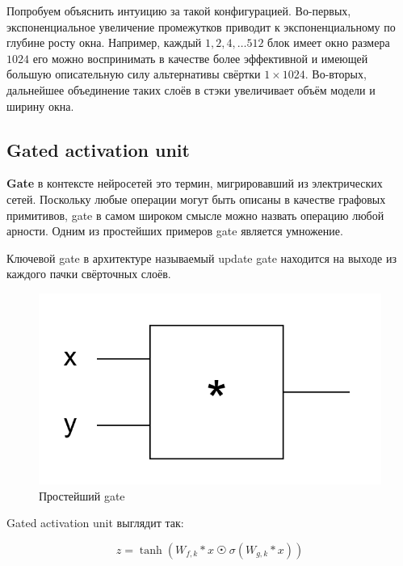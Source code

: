 \documentclass[../diploma.tex]{subfiles}
\begin{document}
Попробуем объяснить интуицию за такой конфигурацией. Во-первых, экспоненциальное увеличение промежутков приводит к экспоненциальному по глубине росту окна. \cite{arxiv:yu-fisher} Например, каждый $1,2,4, \dots 512$ блок имеет окно размера $1024$ его можно воспринимать в качестве более эффективной и имеющей большую описательную силу альтернативы свёртки $1 \times 1024$. Во-вторых, дальнейшее объединение таких слоёв в стэки увеличивает объём модели и ширину окна.

\newpage
\subsection{Gated activation unit}

\begin{definition}
\textbf{Gate} в контексте нейросетей это термин, мигрировавший из электрических сетей. Поскольку любые операции могут быть описаны в качестве графовых примитивов, gate в самом широком смысле можно назвать операцию любой арности. Одним из простейших примеров gate является умножение.

Ключевой gate в архитектуре называемый update gate находится на выходе из каждого пачки свёрточных слоёв.

\begin{figure}[ht!]
  \centering
  \includegraphics[scale=0.35]{img/gate}
  \caption{Простейший gate}
  \label{fig:gate}
\end{figure}

\end{definition}

Gated activation unit выглядит так:

\begin{equation} \label{eq:activation_func}
z = \tanh(W_{f,k} * x \  \astrosun \  \sigma(W_{g,k} * x))
\end{equation}
\end{document}
